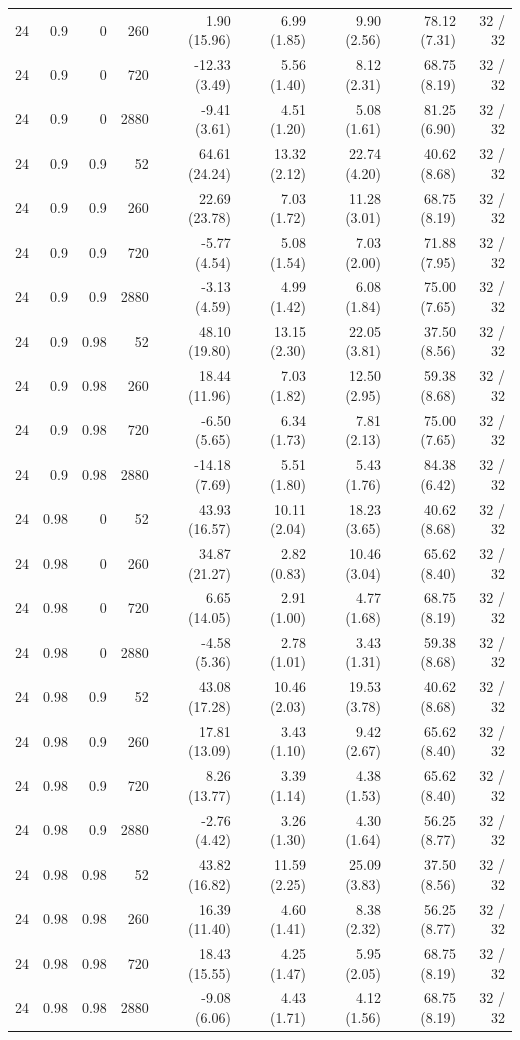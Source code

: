 \begin{longtable}{rrrrrrrrr}
24 & 0.9 & 0 & 260 & 1.90 (15.96) & 6.99 (1.85) & 9.90 (2.56) & 78.12 (7.31) & 32 / 32\\
24 & 0.9 & 0 & 720 & -12.33 (3.49) & 5.56 (1.40) & 8.12 (2.31) & 68.75 (8.19) & 32 / 32\\
24 & 0.9 & 0 & 2880 & -9.41 (3.61) & 4.51 (1.20) & 5.08 (1.61) & 81.25 (6.90) & 32 / 32\\
24 & 0.9 & 0.9 & 52 & 64.61 (24.24) & 13.32 (2.12) & 22.74 (4.20) & 40.62 (8.68) & 32 / 32\\
24 & 0.9 & 0.9 & 260 & 22.69 (23.78) & 7.03 (1.72) & 11.28 (3.01) & 68.75 (8.19) & 32 / 32\\
24 & 0.9 & 0.9 & 720 & -5.77 (4.54) & 5.08 (1.54) & 7.03 (2.00) & 71.88 (7.95) & 32 / 32\\
24 & 0.9 & 0.9 & 2880 & -3.13 (4.59) & 4.99 (1.42) & 6.08 (1.84) & 75.00 (7.65) & 32 / 32\\
24 & 0.9 & 0.98 & 52 & 48.10 (19.80) & 13.15 (2.30) & 22.05 (3.81) & 37.50 (8.56) & 32 / 32\\
24 & 0.9 & 0.98 & 260 & 18.44 (11.96) & 7.03 (1.82) & 12.50 (2.95) & 59.38 (8.68) & 32 / 32\\
24 & 0.9 & 0.98 & 720 & -6.50 (5.65) & 6.34 (1.73) & 7.81 (2.13) & 75.00 (7.65) & 32 / 32\\
24 & 0.9 & 0.98 & 2880 & -14.18 (7.69) & 5.51 (1.80) & 5.43 (1.76) & 84.38 (6.42) & 32 / 32\\
24 & 0.98 & 0 & 52 & 43.93 (16.57) & 10.11 (2.04) & 18.23 (3.65) & 40.62 (8.68) & 32 / 32\\
24 & 0.98 & 0 & 260 & 34.87 (21.27) & 2.82 (0.83) & 10.46 (3.04) & 65.62 (8.40) & 32 / 32\\
24 & 0.98 & 0 & 720 & 6.65 (14.05) & 2.91 (1.00) & 4.77 (1.68) & 68.75 (8.19) & 32 / 32\\
24 & 0.98 & 0 & 2880 & -4.58 (5.36) & 2.78 (1.01) & 3.43 (1.31) & 59.38 (8.68) & 32 / 32\\
24 & 0.98 & 0.9 & 52 & 43.08 (17.28) & 10.46 (2.03) & 19.53 (3.78) & 40.62 (8.68) & 32 / 32\\
24 & 0.98 & 0.9 & 260 & 17.81 (13.09) & 3.43 (1.10) & 9.42 (2.67) & 65.62 (8.40) & 32 / 32\\
24 & 0.98 & 0.9 & 720 & 8.26 (13.77) & 3.39 (1.14) & 4.38 (1.53) & 65.62 (8.40) & 32 / 32\\
24 & 0.98 & 0.9 & 2880 & -2.76 (4.42) & 3.26 (1.30) & 4.30 (1.64) & 56.25 (8.77) & 32 / 32\\
24 & 0.98 & 0.98 & 52 & 43.82 (16.82) & 11.59 (2.25) & 25.09 (3.83) & 37.50 (8.56) & 32 / 32\\
24 & 0.98 & 0.98 & 260 & 16.39 (11.40) & 4.60 (1.41) & 8.38 (2.32) & 56.25 (8.77) & 32 / 32\\
24 & 0.98 & 0.98 & 720 & 18.43 (15.55) & 4.25 (1.47) & 5.95 (2.05) & 68.75 (8.19) & 32 / 32\\
24 & 0.98 & 0.98 & 2880 & -9.08 (6.06) & 4.43 (1.71) & 4.12 (1.56) & 68.75 (8.19) & 32 / 32\\
\end{longtable}
\endgroup

